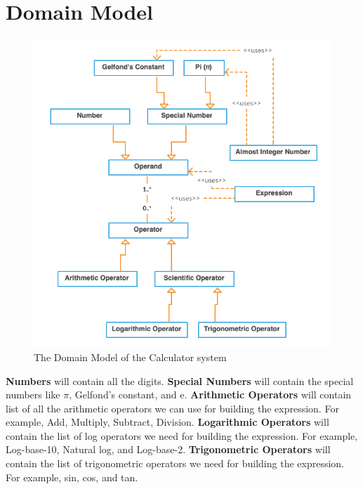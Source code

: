 \documentclass{article}
\begin{document}
\section{Domain Model}
\begin{center}
    \begin{figure}[h]
      \includegraphics[scale=0.56]{images/n4-domain-model.png}
      \caption{The Domain Model of the Calculator system}
    \end{figure}
\end{center}
\begin{flushleft}
\textbf{Numbers} will contain all the digits. \newline
\textbf{Special Numbers} will contain the special numbers like $\pi$, Gelfond's constant, and e.\newline
\textbf{Arithmetic Operators} will contain list of all the arithmetic operators we can use for building the expression. For example, Add, Multiply, Subtract, Division.\newline
\textbf{Logarithmic Operators} will contain the list of log operators we need for building the expression. For example, Log-base-10, Natural log, and Log-base-2.\newline
\textbf{Trigonometric Operators} will contain the list of trigonometric operators we need for building the expression. For example, sin, cos, and tan.
\end{flushleft}
\end{document}
